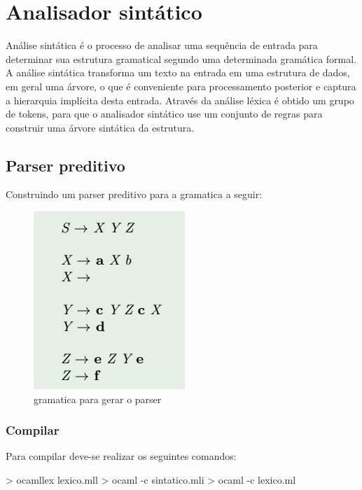 \documentclass[12pt,a4paper]{report}
\begin{document}
\section{Analisador sintático}

Análise sintática é o processo de analisar uma sequência de entrada para determinar sua estrutura gramatical segundo uma determinada gramática formal.
A análise sintática transforma um texto na entrada em uma estrutura de dados, em geral uma árvore, o que é conveniente para processamento posterior e captura a hierarquia implícita desta entrada. Através da análise léxica é obtido um grupo de tokens, para que o analisador sintático use um conjunto de regras para construir uma árvore sintática da estrutura.


\subsection{Parser preditivo}

Construindo um parser preditivo para a gramatica a seguir:
\begin{figure}[!htb]
\centering
\includegraphics[scale=0.7]{Imagens/parser.png}
\caption{gramatica para gerar o parser}
\label{parser}
\end{figure}







\subsubsection{Compilar}

Para compilar deve-se realizar os seguintes comandos:
\begin{terminal}
> ocamllex lexico.mll
> ocaml -c sintatico.mli
> ocaml -c lexico.ml
\end{terminal}
\end{document}
